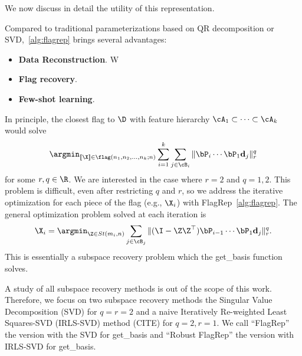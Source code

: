 %        



\noindent We now discuss in detail the utility of this representation.








\begin{remark}\label{rem:utility}
Compared to traditional parameterizations based on QR decomposition or SVD,~\cref{alg:flagrep} brings several advantages:
\begin{itemize}
    \item \textbf{Data Reconstruction}. W
    \item \textbf{Flag recovery}. 
    \item \textbf{Few-shot learning}. 
\end{itemize}\vspace{-2mm}
\end{remark}


In principle, the closest flag to $\D$ with feature hierarchy $\cA_1 \subset \cdots \subset \cA_k$ would solve
\begin{equation}\label{eq: mother equation}
    \argmin_{[\![\X]\!] \in \flag(n_1,n_2, \dots, n_k;n)} \sum_{i=1}^k \sum_{j \in \cB_i}\| \bP_i \cdots \bP_1 \mathbf{d}_j \|_r^q
\end{equation}
for some $r,q \in \R$. We are interested in the case where $r=2$ and $q=1,2$. This problem is difficult, even after restricting $q$ and $r$, so we address the iterative optimization for each piece of the flag (e.g., $\X_i$) with FlagRep~\ref{alg:flagrep}. The general optimization problem solved at each iteration is
\begin{equation}\label{eq:iterative_opt}
    \X_i =  \argmin_{\Z \in St(m_i,n)} \sum_{j \in \cB_j}\| (\I - \Z \Z^\top) \bP_{i-1} \cdots \bP_1 \mathbf{d}_j \|_r^q.
\end{equation}
This is essentially a subspace recovery problem which the get\_basis function solves. 

\begin{remark}
A study of all subspace recovery methods is out of the scope of this work. Therefore, we focus on two subspace recovery methods the Singular Value Decomposition (SVD) for $q=r=2$ and a naive Iteratively Re-weighted Least Squares-SVD (IRLS-SVD) method (CITE) for $q=2,r=1$. We call ``FlagRep'' the version with the SVD for get\_basis and ``Robust FlagRep'' the version with IRLS-SVD for get\_basis.
\end{remark}

